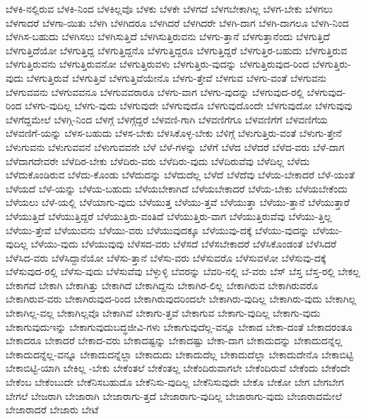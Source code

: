 {ಬೆಳಕಿ-ನಲ್ಲಿರುವ
ಬೆಳಕಿ-ನಿಂದ
ಬೆಳಕಿಲ್ಲವೊ
ಬೆಳಕು
ಬೆಳಕೇ
ಬೆಳಗದೆ
ಬೆಳಗಬೇಕಾಗಿಲ್ಲ
ಬೆಳಗ-ಬೇಕು
ಬೆಳಗಲು
ಬೆಳಗಾದರೆ
ಬೆಳಗಾ-ಯಿತು
ಬೆಳಗಿ
ಬೆಳಗಿದರೂ
ಬೆಳಗಿದರೆ
ಬೆಳಗಿದರೇ
ಬೆಳಗಿ-ದಾಗ
ಬೆಳಗಿ-ದಾಗಲೂ
ಬೆಳಗಿ-ನಿಂದ
ಬೆಳಗಿಸ-ಬಹುದು
ಬೆಳಗಿಸಲು
ಬೆಳಗಿಸುತ್ತಿದೆ
ಬೆಳಗಿಸುತ್ತಿರುವನು
ಬೆಳಗು-ತ್ತಾನೆ
ಬೆಳಗುತ್ತಾನೆಂದು
ಬೆಳಗುತ್ತಿದೆ
ಬೆಳಗುತ್ತಿದೆಯೋ
ಬೆಳಗುತ್ತಿದ್ದ
ಬೆಳಗುತ್ತಿದ್ದನೊ
ಬೆಳಗುತ್ತಿದ್ದರೂ
ಬೆಳಗುತ್ತಿದ್ದರೆ
ಬೆಳಗುತ್ತಿರ-ಬಹುದು
ಬೆಳಗುತ್ತಿರುವ
ಬೆಳಗುತ್ತಿರುವನು
ಬೆಳಗುತ್ತಿರುವನೋ
ಬೆಳಗುತ್ತಿರುವಳು
ಬೆಳಗುತ್ತಿರು-ವುದನ್ನು
ಬೆಳಗುತ್ತಿರುವುದ-ರಿಂದ
ಬೆಳಗುತ್ತಿರು-ವುದು
ಬೆಳಗುತ್ತಿರುವೆ
ಬೆಳಗುತ್ತಿವೆ
ಬೆಳಗುತ್ತಿವೆಯೇನೊ
ಬೆಳಗು-ತ್ತೇವೆ
ಬೆಳಗುವ
ಬೆಳಗು-ವಂತೆ
ಬೆಳಗುವನು
ಬೆಳಗುವವನು
ಬೆಳಗುವವನೂ
ಬೆಳಗುವವರಾರೂ
ಬೆಳಗು-ವಾಗ
ಬೆಳಗು-ವುದನ್ನು
ಬೆಳಗುವುದ-ರಲ್ಲಿ
ಬೆಳಗುವುದ-ರಿಂದ
ಬೆಳಗು-ವುದಿಲ್ಲ
ಬೆಳಗು-ವುದು
ಬೆಳಗುವುದೇ
ಬೆಳಗುವುದೊ
ಬೆಳಗುವುದೊಂದೇ
ಬೆಳಗುವುದೋ
ಬೆಳಗುವುವು
ಬೆಳಗೆದ್ದಮೇಲೆ
ಬೆಳಗ್ಗಿ-ನಿಂದ
ಬೆಳಗ್ಗೆ
ಬೆಳಗ್ಗೆದ್ದರೆ
ಬೆಳವಣಿ-ಗಾಗಿ
ಬೆಳವಣಿಗೆಗೂ
ಬೆಳವಣಿಗೆಗೆ
ಬೆಳವಣಿಗೆಯ
ಬೆಳವಣಿಗೆ-ಯನ್ನು
ಬೆಳಸ-ಬಹುದು
ಬೆಳಸ-ಬೇಕು
ಬೆಳಸಿಕೊಳ್ಳ-ಬೇಕು
ಬೆಳಿಗ್ಗೆ
ಬೆಳುಗುತ್ತಿರು-ವಂತೆ
ಬೆಳುಗು-ತ್ತೇನೆ
ಬೆಳುಗುವನು
ಬೆಳುಗುವವನೆ
ಬೆಳುಗುವವನೇ
ಬೆಳೆ
ಬೆಳೆ-ಗಳನ್ನು
ಬೆಳೆಗೆ
ಬೆಳೆದ
ಬೆಳೆದರೆ
ಬೆಳೆದ-ವರು
ಬೆಳೆ-ದಾಗ
ಬೆಳೆದಾಗದೇವರೇ
ಬೆಳೆದಿರ-ಬೇಕು
ಬೆಳೆದಿರು-ವರು
ಬೆಳೆದಿರು-ವುದು
ಬೆಳೆದಿರುವೆವು
ಬೆಳೆದಿಲ್ಲ
ಬೆಳೆದು
ಬೆಳೆದುಕೊಂಡಿರುವ
ಬೆಳೆದು-ಕೊಂಡು
ಬೆಳೆದುದನ್ನು
ಬೆಳೆದುದೆಲ್ಲ
ಬೆಳೆದೆ
ಬೆಳೆದೆವು
ಬೆಳೆಯ-ಬೇಕಾದರೆ
ಬೆಳೆ-ಯಂತೆ
ಬೆಳೆಯದೆ
ಬೆಳೆ-ಯನ್ನು
ಬೆಳೆಯ-ಬಹುದು
ಬೆಳೆಯಬೇಕಾಗಿದೆ
ಬೆಳೆಯಬೇಕಾದರೆ
ಬೆಳೆಯ-ಬೇಕು
ಬೆಳೆಯಬೇಕೆಂದು
ಬೆಳೆಯಲು
ಬೆಳೆ-ಯಲ್ಲಿ
ಬೆಳೆಯಾಗು-ವುದು
ಬೆಳೆಯುತ್ತ
ಬೆಳೆಯು-ತ್ತವೆ
ಬೆಳೆಯುತ್ತಾ
ಬೆಳೆಯು-ತ್ತಾನೆ
ಬೆಳೆಯುತ್ತಾರೆ
ಬೆಳೆಯುತ್ತಿದೆ
ಬೆಳೆಯುತ್ತಿದ್ದರೆ
ಬೆಳೆಯುತ್ತಿರು-ವಂತಿದೆ
ಬೆಳೆಯುತ್ತಿರು-ವಾಗ
ಬೆಳೆಯುತ್ತಿರುವೆವು
ಬೆಳೆಯು-ತ್ತಿಲ್ಲ
ಬೆಳೆಯು-ತ್ತೇವೆ
ಬೆಳೆಯುವನು
ಬೆಳೆಯು-ವರು
ಬೆಳೆಯುವುದಕ್ಕೂ
ಬೆಳೆಯುವು-ದಕ್ಕೆ
ಬೆಳೆಯು-ವುದನ್ನು
ಬೆಳೆಯು-ವುದಿಲ್ಲ
ಬೆಳೆಯು-ವುದು
ಬೆಳೆಯುವುವು
ಬೆಳೆಸದ-ವರು
ಬೆಳೆಸದೆ
ಬೆಳೆಸಬೇಕಾದರೆ
ಬೆಳೆಸಿಕೊಂಡಂತೆ
ಬೆಳೆಸಿದರೆ
ಬೆಳೆಸಿದ-ವರು
ಬೆಳೆಸಿದ್ದಾನೆಯೋ
ಬೆಳೆಸು-ತ್ತಾನೆ
ಬೆಳೆಸು-ವರು
ಬೆಳೆಸುವರೊ
ಬೆಳೆಸುವಳೋ
ಬೆಳೆಸುವು-ದಕ್ಕೆ
ಬೆಳೆಸುವುದ-ರಲ್ಲಿ
ಬೆಳೆಸು-ವುದು
ಬೆಳೆಸುವೆವು
ಬೆಳ್ಳುಳ್ಳಿ
ಬೆವರನ್ನು
ಬೆವರಿ-ನಲ್ಲಿ
ಬೆ-ವರು
ಬೆಸ್
ಬೆಸ್ತ
ಬೆಸ್ತ-ರಲ್ಲಿ
ಬೇಕಲ್ಲ
ಬೇಕಾಗದೆ
ಬೇಕಾಗಿ
ಬೇಕಾಗಿತ್ತು
ಬೇಕಾಗಿದೆ
ಬೇಕಾಗಿದ್ದನು
ಬೇಕಾಗಿರ-ಲಿಲ್ಲ
ಬೇಕಾಗಿರುವ
ಬೇಕಾಗಿರುವರೊ
ಬೇಕಾಗಿರುವ-ವರು
ಬೇಕಾಗಿರುವುದ-ರಿಂದ
ಬೇಕಾಗಿರುವುದರಿಂದಲೇ
ಬೇಕಾಗಿರು-ವುದಿಲ್ಲ
ಬೇಕಾಗಿರು-ವುದು
ಬೇಕಾಗಿಲ್ಲ
ಬೇಕಾಗಿಲ್ಲ-ವಲ್ಲ
ಬೇಕಾಗಿಲ್ಲವೊ
ಬೇಕಾಗಿವೆ
ಬೇಕಾಗು-ತ್ತವೆ
ಬೇಕಾಗುವ
ಬೇಕಾಗು-ವುದಿಲ್ಲ
ಬೇಕಾಗು-ವುದು
ಬೇಕಾಗುವುದುಇನ್ನು
ಬೇಕಾಗುವುದುಬದ್ಧಜೀವಿ-ಗಳು
ಬೇಕಾಗುವುದೆಲ್ಲ-ವನ್ನೂ
ಬೇಕಾದ
ಬೇಕಾ-ದಂತೆ
ಬೇಕಾದರಂತೂ
ಬೇಕಾದರೂ
ಬೇಕಾದರೆ
ಬೇಕಾದ-ವರು
ಬೇಕಾದಷ್ಟನ್ನು
ಬೇಕಾದಷ್ಟು
ಬೇಕಾ-ದಾಗ
ಬೇಕಾದುದನ್ನು
ಬೇಕಾದುದನ್ನೆಲ್ಲ
ಬೇಕಾದುದನ್ನೆಲ್ಲ-ವನ್ನೂ
ಬೇಕಾದುದನ್ನೆಲ್ಲಾ
ಬೇಕಾದುದು
ಬೇಕಾದುದೆಲ್ಲ
ಬೇಕಾದುದೆಲ್ಲಾ
ಬೇಕಾದುದೇನೊ
ಬೇಕಾಬಿಟ್ಟಿ
ಬೇಕಾಬಿಟ್ಟಿ-ಯಾಗಿ
ಬೇಕಿಲ್ಲ
-ಬೇಕು
ಬೇಕೆಂತಲೆ
ಬೇಕೆಂತಲ್ಲ
ಬೇಕೆಂದಿರುವಾಗಲೇ
ಬೇಕೆಂದಿರುವೆ
ಬೇಕೆಂದು
ಬೇಕೆಂದೇ
ಬೇಕೆಂಬ
ಬೇಕೆಂಬುದೇ
ಬೇಕೆನಿಸಬಹುದೊ
ಬೇಕೆನಿಸು-ವುದಿಲ್ಲ
ಬೇಕೆನಿಸುವುದೇ
ಬೇಕೊ
ಬೇಕೋ
ಬೇಗ
ಬೇಗಬೇಗ
ಬೇಗಲೆ
ಬೇಜರಾಗಿ
ಬೇಜಾರಾಗಿ
ಬೇಜಾರಾಗು-ತ್ತದೆ
ಬೇಜಾರಾಗು-ವುದಿಲ್ಲ
ಬೇಜಾರಾಗು-ವುದು
ಬೇಜಾರಾದಮೇಲೆ
ಬೇಜಾರಾದರೆ
ಬೇಜಾರು
ಬೇಟೆ
}
